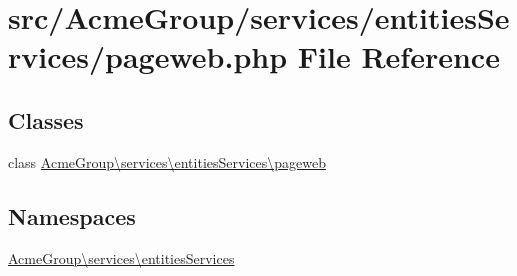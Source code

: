 \hypertarget{services_2entities_services_2pageweb_8php}{\section{src/\+Acme\+Group/services/entities\+Services/pageweb.php File Reference}
\label{services_2entities_services_2pageweb_8php}
}
\subsection*{Classes}
\begin{DoxyCompactItemize}
\item 
class \hyperlink{class_acme_group_1_1services_1_1entities_services_1_1pageweb}{Acme\+Group\textbackslash{}services\textbackslash{}entities\+Services\textbackslash{}pageweb}
\end{DoxyCompactItemize}
\subsection*{Namespaces}
\begin{DoxyCompactItemize}
\item 
 \hyperlink{namespace_acme_group_1_1services_1_1entities_services}{Acme\+Group\textbackslash{}services\textbackslash{}entities\+Services}
\end{DoxyCompactItemize}
